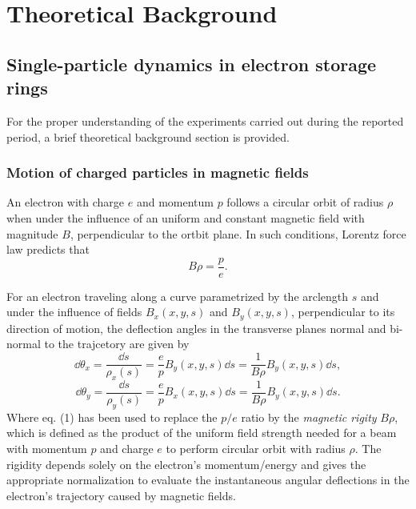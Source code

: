 \chapter{Theoretical Background}
\section{Single-particle dynamics in electron storage rings}
For the proper understanding of the experiments carried out during the reported period, a brief theoretical background section is provided.
\subsection{Motion of charged particles in magnetic fields}
An electron with charge $e$ and momentum $p$ follows a circular orbit of radius $\rho$ when under the influence of an uniform and constant magnetic field with magnitude $B$, perpendicular to the ortbit plane. In such conditions, Lorentz force law predicts that
\begin{equation}
    B\rho = \frac{p}{e}.
\end{equation}

For an electron traveling along a curve parametrized by the arclength $s$ and under the influence of fields $B_x(x,y,s)$  and $B_y(x,y,s)$, perpendicular to its direction of motion, the deflection angles in the transverse planes normal and bi-normal to the trajcetory are given by
    \begin{equation}
    \dd{\theta_x} = \frac{\dd{s}}{\rho_x(s)} = \frac{e}{p}B_y(x,y,s)\dd s = \frac{1}{B\rho}B_y(x,y,s)\dd s,
    \end{equation}
    \begin{equation}
        \dd{\theta_y} = \frac{\dd{s}}{\rho_y(s)} = \frac{e}{p}B_x(x,y,s)\dd s = \frac{1}{B\rho}B_y(x,y,s)\dd s.
    \end{equation}
Where eq. (1) has been used to replace the $p/e$ ratio by the \textit{magnetic rigity} $B\rho$, which is defined as the product of the uniform field strength needed for a beam with momentum $p$ and charge $e$ to perform circular orbit with radius $\rho$. The rigidity depends solely on the electron's momentum/energy and gives the appropriate normalization to evaluate the instantaneous angular deflections in the electron's trajectory caused by magnetic fields.
